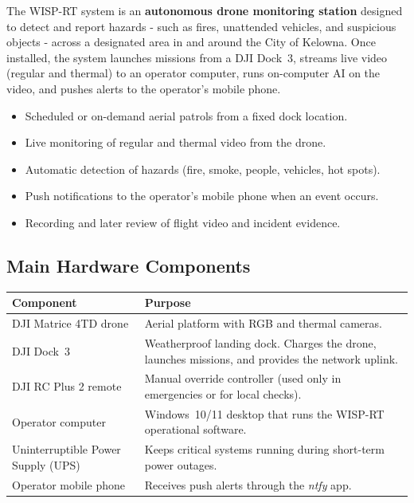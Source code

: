 \documentclass[11pt,letterpaper]{article}
\begin{document}
The WISP-RT system is an \textbf{autonomous drone monitoring station} designed
to detect and report hazards - such as fires, unattended vehicles, and
suspicious objects - across a designated area in and around the City of
Kelowna. Once installed, the system launches missions from a DJI Dock~3,
streams live video (regular and thermal) to an operator computer, runs
on-computer AI on the video, and pushes alerts to the operator's mobile
phone.

\begin{infobox}
\begin{itemize}[leftmargin=1.3em]
  \item Scheduled or on-demand aerial patrols from a fixed dock location.
  \item Live monitoring of regular and thermal video from the drone.
  \item Automatic detection of hazards (fire, smoke, people, vehicles, hot spots).
  \item Push notifications to the operator's mobile phone when an event occurs.
  \item Recording and later review of flight video and incident evidence.
\end{itemize}
\end{infobox}

\subsection{Main Hardware Components}

\begin{tabular}{@{}p{4.5cm}p{10.5cm}@{}}
\toprule
\textbf{Component} & \textbf{Purpose} \\
\midrule
DJI Matrice 4TD drone      & Aerial platform with RGB and thermal cameras. \\
DJI Dock~3                 & Weatherproof landing dock. Charges the drone, launches missions, and provides the network uplink. \\
DJI RC Plus 2 remote       & Manual override controller (used only in emergencies or for local checks). \\
Operator computer          & Windows~10/11 desktop that runs the WISP-RT operational software. \\
Uninterruptible Power Supply (UPS) & Keeps critical systems running during short-term power outages. \\
Operator mobile phone      & Receives push alerts through the \emph{ntfy} app. \\
\bottomrule
\end{tabular}
\end{document}
